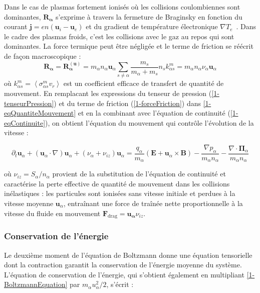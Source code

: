 \begin{refsection}
Dans le cas de plasmas fortement ionisés où les collisions coulombiennes sont
dominantes, $\mathbf{R_\alpha}$ s'exprime à travers la fermeture de
Braginsky en fonction du courant $\mathbf
j=en\left(\mathbf u_i-\mathbf u_e\right)$ et du gradient de température
électronique $\nabla T_e$~\parencite{Braginsky}. Dans le cadre des plasmas
froids, c'est les collisions avec le gaz au repos qui sont dominantes. La force termique peut être
négligée et le terme de friction se réécrit de façon macroscopique :
\begin{equation}
\label{1-forceFriction}
\mathbf{R_{\alpha}}=\mathbf{R_{\alpha}^{(\mathbf
u)}}=m_\alpha n_\alpha\mathbf u_\alpha\sum_{s\neq\alpha}\frac{m_s}{m_\alpha+m_s}
n_sk^m_{\alpha s} = m_\alpha n_\alpha \nu_\alpha \mathbf u_\alpha
\end{equation}
où $k^m_{\alpha s}=\left<\sigma^m_{\alpha s}v_r\right>$ est un coefficient
efficace de transfert de quantité de mouvement. En remplacant les expressions du
tenseur de pression (\eqref{1-tenseurPression}) et du terme de friction (\eqref{1-forceFriction}) dans
\eqref{1-eqQuantiteMouvement} et en la combinant avec l'équation de continuité
(\eqref{1-eqContinuite}), on obtient l'équation du mouvement qui contrôle
l'évolution de la vitesse :

\begin{equation}
\label{1-eqMouvement}
\partial_t \mathbf{u}_\alpha + (\mathbf{u}_\alpha\cdot\nabla)\mathbf{u}_\alpha
+\left(\nu_\alpha+\nu_{iz}\right) \mathbf
u_\alpha=\frac{q_\alpha}{m_\alpha}\left(\mathbf E+\mathbf u_\alpha\times \mathbf
B\right) -\frac{\nabla p_\alpha}{m_\alpha n_\alpha} -\frac{\nabla\cdot\boldsymbol{\Pi}_\alpha}{m_\alpha n_\alpha}
\end{equation}

où $\nu_{{iz}}=S_\alpha/n_\alpha$ provient de la substitution de l'équation
de continuité et caractérise la perte effective de quantité de mouvement
dans les collisions inélastiques : les particules sont ionisées sans
vitesse initiale et perdues à la vitesse moyenne $\mathbf u_\alpha$, entraînant une force de traînée nette
proportionnelle à la vitesse du fluide en mouvement $\mathbf
F_{\text{drag}}=\mathbf{u_\alpha}\nu_{{iz}}$.

\subsubsection{Conservation de l'énergie}
Le deuxième moment de l'équation de Boltzmann donne une équation tensorielle
dont la contraction garantit la conservation de l'énergie moyenne du système.
L'équation de conservation de
l'énergie, qui s'obtient également en multipliant \eqref{1-BoltzmannEquation}
par $m_\alpha {u}_\alpha^2/2$, s'écrit :


\end{refsection}

